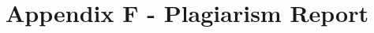 \newpage
\flushleft
\section*{Appendix F - Plagiarism Report} 
\centering


\begin{figure}[!hbt]
    \centering
    \noindent{}
    \label{fig:TURNITIN_REPORT}
\end{figure}

\begin{figure}[!hbt]
    \centering
    \noindent{}
    \label{fig:TURNITIN_REPORT1}
\end{figure}